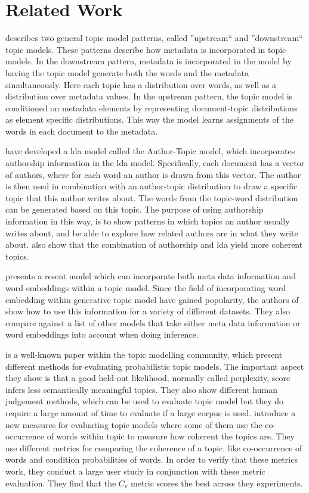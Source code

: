 \section{Related Work}

\citet{mimno2008topic} describes two general topic model patterns, called ''upstream`` and ''downstream`` topic models.
These patterns describe how metadata is incorporated in topic models.
In the downstream pattern, metadata is incorporated in the model by having the topic model generate both the words and the metadata simultaneously.
Here each topic has a distribution over words, as well as a distribution over metadata values.
In the upstream pattern, the topic model is conditioned on metadata elements by representing document-topic distributions as element specific distributions.
This way the model learns assignments of the words in each document to the metadata.

\citet{author_topic_2012} have developed a \gls{lda} model called the Author-Topic model, which incorporates authorship information in the \gls{lda} model.
Specifically, each document has a vector of authors, where for each word an author is drawn from this vector.
The author is then used in combination with an author-topic distribution to draw a specific topic that this author writes about.
The words from the topic-word distribution can be generated based on this topic.
The purpose of using authorship information in this way, is to show patterns in which topics an author usually writes about, and be able to explore how related authors are in what they write about.
\citeauthor{author_topic_2012} also show that the combination of authorship and \gls{lda} yield more coherent topics.


\citet{MetaLDA2017} presents a resent model which can incorporate both meta data information and word embeddings within a topic model.
Since the field of incorporating word embedding within generative topic model have gained popularity\cite{dieng2020topic}, the authors of \cite{MetaLDA2017} show how to use this information for a variety of different datasets.
They also compare against a list of other models that take either meta data information or word embeddings into account when doing inference.


\citet{tea_leaves} is a well-known paper within the topic modelling community, which present different methods for evaluating probabilistic topic models. 
The important aspect they show is that a good held-out likelihood, normally called perplexity, score infers less semantically meaningful topics.
They also show different human judgement methods, which can be used to evaluate topic model but they do require a large amount of time to evaluate if a large corpus is used.
\citet{topic_coherence_2015} introduce a new measures for evaluating topic models where some of them use the co-occurrence of words within topic to measure how coherent the topics are. 
They use different metrics for comparing the coherence of a topic, like co-occurrence of words and condition probabilities of words.
In order to verify that these metrics work, they conduct a large user study in conjunction with these metric evaluation.
They find that the $C_v$ metric scores the best across they experiments. 


